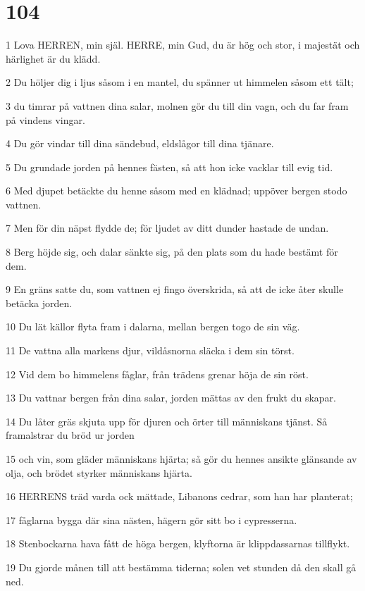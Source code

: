\chapter{104}

\par 1 Lova HERREN, min själ. HERRE, min Gud, du är hög och stor, i majestät och härlighet är du klädd.
\par 2 Du höljer dig i ljus såsom i en mantel, du spänner ut himmelen såsom ett tält;
\par 3 du timrar på vattnen dina salar, molnen gör du till din vagn, och du far fram på vindens vingar.
\par 4 Du gör vindar till dina sändebud, eldslågor till dina tjänare.
\par 5 Du grundade jorden på hennes fästen, så att hon icke vacklar till evig tid.
\par 6 Med djupet betäckte du henne såsom med en klädnad; uppöver bergen stodo vattnen.
\par 7 Men för din näpst flydde de; för ljudet av ditt dunder hastade de undan.
\par 8 Berg höjde sig, och dalar sänkte sig, på den plats som du hade bestämt för dem.
\par 9 En gräns satte du, som vattnen ej fingo överskrida, så att de icke åter skulle betäcka jorden.
\par 10 Du lät källor flyta fram i dalarna, mellan bergen togo de sin väg.
\par 11 De vattna alla markens djur, vildåsnorna släcka i dem sin törst.
\par 12 Vid dem bo himmelens fåglar, från trädens grenar höja de sin röst.
\par 13 Du vattnar bergen från dina salar, jorden mättas av den frukt du skapar.
\par 14 Du låter gräs skjuta upp för djuren och örter till människans tjänst. Så framalstrar du bröd ur jorden
\par 15 och vin, som gläder människans hjärta; så gör du hennes ansikte glänsande av olja, och brödet styrker människans hjärta.
\par 16 HERRENS träd varda ock mättade, Libanons cedrar, som han har planterat;
\par 17 fåglarna bygga där sina nästen, hägern gör sitt bo i cypresserna.
\par 18 Stenbockarna hava fått de höga bergen, klyftorna är klippdassarnas tillflykt.
\par 19 Du gjorde månen till att bestämma tiderna; solen vet stunden då den skall gå ned.
